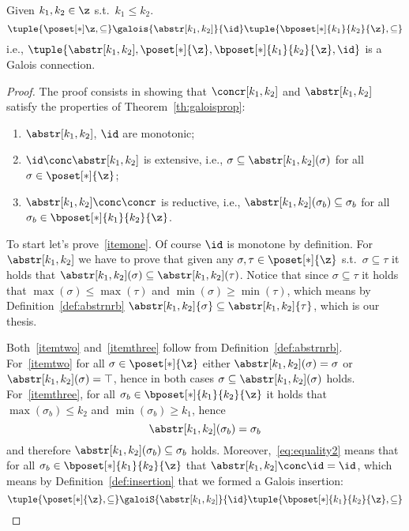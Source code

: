 \begin{lemma}
  Given \(k_1, k_2 \in \z\) s.t.\ \(k_1\leq k_2\).
  \begin{equation*}
    \tuple{\poset[*]\z, \subseteq} \galois{\abstr[k_1,k_2]}{\id} \tuple{\bposet[*]{k_1}{k_2}{\z}, \subseteq}
  \end{equation*}
  i.e.,
  \(\tuple{\abstr[k_1,k_2], \poset[*]{\z},
    {\bposet[*]{k_1}{k_2}{\z}}, \id}\) is a Galois connection.
\end{lemma} 

\begin{proof}
  The proof consists in showing that \(\concr[k_1,k_2]\) and
  \(\abstr[k_1,k_2]\) satisfy the properties of
  Theorem~\ref{th:galoisprop}:
  \begin{enumerate}[label={(\arabic*)}]
  \item\label{itemone} \(\abstr[k_1,k_2]\), \(\id\) are monotonic;
  \item\label{itemtwo} \(\id \conc \abstr[k_1, k_2]\) is extensive, i.e.,
    \(\sigma \subseteq \abstr[k_1,k_2](\sigma)\) for all
    \(\sigma \in \poset[*]{\z}\);
  \item\label{itemthree} \(\abstr[k_1,k_2] \conc\concr\) is reductive, i.e.,
    \(\abstr[k_1,k_2](\sigma_b) \subseteq \sigma_b\) for all
    \(\sigma_b \in \bposet[*]{k_1}{k_2}{\z}\).
  \end{enumerate}
  To start let's prove~\ref{itemone}. Of course \(\id\) is monotone by
  definition. For \(\abstr[k_1,k_2]\) we have to prove that given any
  \(\sigma, \tau \in \poset[*]{\z}\) s.t.\ \(\sigma \subseteq \tau\)
  it holds that
  \(\abstr[k_1,k_2](\sigma) \subseteq \abstr[k_1,k_2](\tau)\). Notice
  that since \(\sigma \subseteq \tau\) it holds that
  \(\max(\sigma) \leq \max(\tau)\) and
  \(\min(\sigma) \geq \min(\tau)\), which means by
  Definition~\ref{def:abstrnrb}
  \(\abstr[k_1,k_2]{\sigma} \subseteq \abstr[k_1,k_2]{\tau}\), which
  is our thesis.

  \medskip

  \noindent
  Both~\ref{itemtwo} and~\ref{itemthree} follow from
  Definition~\ref{def:abstrnrb}. For~\ref{itemtwo} for all
  \(\sigma \in \poset[*]{\z}\) either
  \(\abstr[k_1,k_2]({\sigma}) = \sigma\) or
  \(\abstr[k_1,k_2]({\sigma}) = \top\), hence in both cases
  \(\sigma \subseteq \abstr[k_1,k_2]({\sigma})\)
  holds. For~\ref{itemthree}, for all
  \(\sigma_b \in \bposet[*]{k_1}{k_2}{\z}\) it holds that
  \(\max(\sigma_b) \leq k_2\) and \(\min(\sigma_b) \geq k_1\), hence
  \begin{equation}\label{eq:equality2}
    \abstr[k_1,k_2]({\sigma_b}) = \sigma_b
  \end{equation}
  and therefore \(\abstr[k_1,k_2]({\sigma_b}) \subseteq \sigma_b\)
  holds.  Moreover,~\eqref{eq:equality2} means that for all
  \(\sigma_b \in \bposet[*]{k_1}{k_2}{\z}\) that
  \(\abstr[k_1,k_2] \conc \id = \id\), which means by
  Definition~\ref{def:insertion} that we formed a Galois insertion:
  \begin{equation*}
    \tuple{\poset[*]{\z}, \subseteq}
    \galoiS{\abstr[k_1,k_2]}{\id}
    \tuple{\bposet[*]{k_1}{k_2}{\z}, \subseteq}
    \qedhere
  \end{equation*}
\end{proof}
